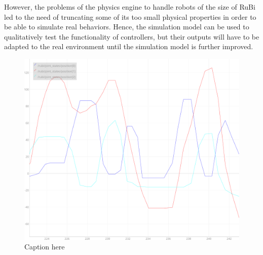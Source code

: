 However, the problems of the physics engine to handle robots of the size of RuBi led to the need of truncating some of its too small physical properties in order to be able to simulate real behaviors.
Hence, the simulation model can be used to qualitatively test the functionality of controllers, but their outputs will have to be adapted to the real environment until the simulation model is further improved.

\begin{figure}[h]
	\centering
	\includegraphics[width=\textwidth]{figures/position_measurements.pdf}
	\caption{Caption here}
	\label{fig:figure1}
\end{figure}

